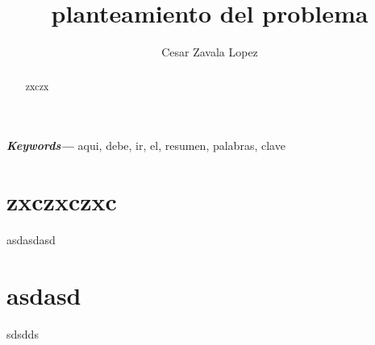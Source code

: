 \documentclass{article}
\date{}
\title{planteamiento del problema}
\author[1,*]{Cesar Zavala Lopez \orcidlink{8489-4949-4949-8489}}
\affil[1]{Departamento de ITI, UPV}
\providecommand{\keywords}[1]
{
  \small  
  \textbf{\textit{Keywords---}} #1
}
\begin{document}
\maketitle
\begin{abstract}
zxczx
\end{abstract}
\keywords{aqui, debe, ir, el, resumen, palabras, clave}
\section{zxczxczxc}
asdasdasd
\section{asdasd}
sdsdds
\end{document}
